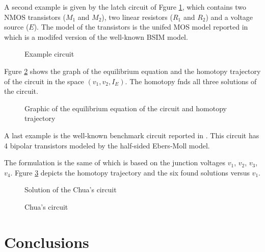 \documentclass[conference]{IEEEtran}
\begin{document}
 A second example is given by the latch circuit of Fgure
 \ref{circu2}, which  contains
two NMOS transistors ($M_1$ and $M_2$), two linear resistors
($R_1$ and $R_2$) and a voltage source ($E$). The model of the transistors is the unifed MOS model
reported in \cite{homo_BSIM} which is a modifed version of the well-known
BSIM model.


\begin{figure}[hbtp]
\centerline{
\epsfxsize=90mm
}
\caption{Example circuit}
\label{circu2}
\end{figure}

Fgure \ref{circugraf} shows the graph of the equilibrium
equation and the homotopy trajectory of
the circuit in the space $(v_1,v_2,I_E)$. The homotopy fnds
all three solutions of the circuit.

\begin{figure}[hbtp]
\centerline{
\epsfxsize=90mm
}
\caption{Graphic of the equilibrium equation of the circuit and homotopy trajectory}
\label{circugraf}
\end{figure}



A last example is the well-known benchmark circuit reported in
\cite{homo_chua}. This circuit has 4 bipolar transistors modeled by the half-sided Ebers-Moll model.

The formulation is the same of \cite{homo_chua} which is based
on the junction voltages $v_1$, $v_2$, $v_3$, $v_4$. Fgure
\ref{chuaf} depicts
the homotopy trajectory and the six found solutions versus $v_1$.

\begin{figure}[hbt]
\centerline{
\epsfxsize=90mm
}
\caption{Solution of the Chua's circuit}
\label{chuaf}
\end{figure}


\begin{figure}[hbt]
\centerline{
\epsfxsize=90mm
}
\caption{Chua's circuit}
\label{chua}
\end{figure}


\section{Conclusions}
\end{document}
